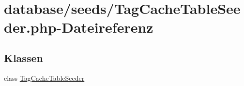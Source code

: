\hypertarget{TagCacheTableSeeder_8php}{}\section{database/seeds/\+Tag\+Cache\+Table\+Seeder.php-\/\+Dateireferenz}
\label{TagCacheTableSeeder_8php}
\subsection*{Klassen}
\begin{DoxyCompactItemize}
\item 
class \hyperlink{classTagCacheTableSeeder}{Tag\+Cache\+Table\+Seeder}
\end{DoxyCompactItemize}

